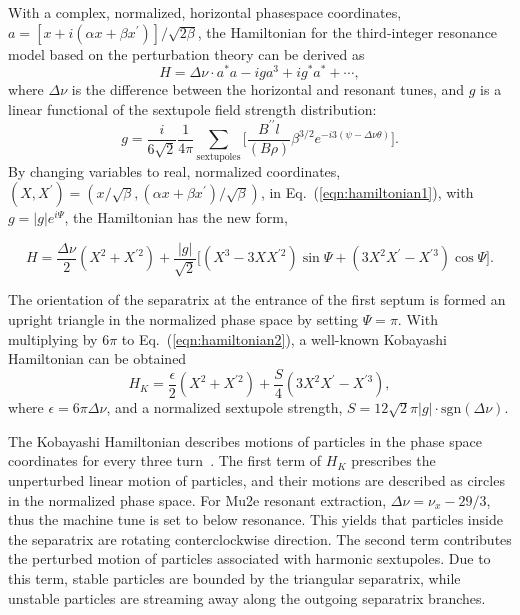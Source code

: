 \documentclass[aps,prstab,onecolumn,preprint,endfloats,11pt]{revtex4-1}
\begin{document}
With a complex, normalized, horizontal phasespace coordinates, $a = [x + i (\alpha x + \beta x^{\prime})] / \sqrt{2 \beta}$, the Hamiltonian for the third-integer resonance model based on the perturbation theory can be derived as~\cite{preliminary}
\begin{equation}
  H = \Delta \nu \cdot a^{*} a - i g a^{3} + i g^{*} a^{*} + \cdots,
\label{eqn:hamiltonian1}
\end{equation}
where $\Delta \nu$ is the difference between the horizontal and resonant tunes, and $g$ is  a linear functional of the sextupole field strength distribution:
\begin{equation*}
  g = \frac{i}{6 \sqrt{2}} \frac{1}{4 \pi} \sum_{\text{sextupoles}}
      \Bigg[
        \frac{B^{\prime\prime} l}{(B\rho)} \beta^{3/2}
        e^{-i 3(\psi - \Delta \nu \theta)}
      \Bigg].
\end{equation*}
By changing variables to real, normalized coordinates, $(X, X^{\prime}) = (x/\sqrt{\beta}, (\alpha x + \beta x^{\prime}) / \sqrt{\beta})$, in Eq.~(\ref{eqn:hamiltonian1}), with $g = |g| e^{i \Psi}$, the Hamiltonian has the new form,
\begin{widetext}
\begin{equation}
  H = \frac{\Delta \nu}{2} \left( X^{2} + X^{\prime2} \right)
    + \frac{|g|}{\sqrt{2}}
      \Big[
        \left( X^{3} - 3 X X^{\prime 2} \right) \sin{\Psi}
      + \left( 3 X^{2} X^{\prime} - X^{\prime 3} \right) \cos{\Psi}
      \Big].
\label{eqn:hamiltonian2}
\end{equation}
\end{widetext}
The orientation of the separatrix at the entrance of the first septum is formed an upright triangle in the normalized phase space by setting $\Psi = \pi$. With multiplying by $6 \pi$ to Eq.~(\ref{eqn:hamiltonian2}), a well-known Kobayashi Hamiltonian can be obtained
\begin{equation}
  H_{K} = \frac{\epsilon}{2} \left( X^{2} + X^{\prime2} \right)
    + \frac{S}{4} \left( 3 X^{2} X^{\prime} - X^{\prime 3} \right),
\label{eqn:kobayashi}
\end{equation}
where $\epsilon = 6\pi \Delta \nu$, and a normalized sextupole strength, $S = 12\sqrt{2} \pi |g| \cdot \text{sgn}(\Delta \nu)$. 

The Kobayashi Hamiltonian describes motions of particles in the phase space coordinates for every three turn~\cite{kobayashi}.
The first term of $H_{K}$ prescribes the unperturbed linear motion of particles, and their motions are described as circles in the normalized phase space. For Mu2e resonant extraction, $\Delta \nu = \nu_{x} - 29/3$, thus the machine tune is set to below resonance. This yields that particles inside the separatrix are rotating conterclockwise direction. The second term contributes the perturbed motion of particles associated with harmonic sextupoles. Due to this term, stable particles are bounded by the triangular separatrix, while unstable particles are streaming away along the outgoing separatrix branches. 
\end{document}
